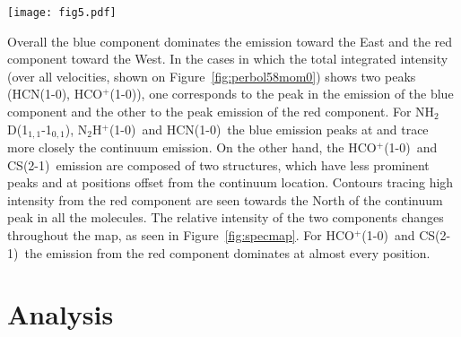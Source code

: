 \documentclass[iop]{emulateapj}
\newcommand{\nhtd}{\mbox{\rm NH$_2$D(1$_{1,1}$-1$_{0,1}$)}}
\newcommand{\nthp}{\mbox{\rm N$_2$H$^+$(1-0)}}
\newcommand{\hcn}{\mbox{\rm HCN(1-0)}}
\newcommand{\hcop}{\mbox{\rm  HCO$^+$(1-0)}}
\newcommand{\cs}{\mbox{\rm CS(2-1)}}
\begin{document}
\begin{figure*}[t]%

\texttt{[image: fig5.pdf]}
\caption{Integrated intensity maps for the red and blue peaks in Figure~\ref{fig:specmap}. The blue (red) contours correspond to the blue (red) component. The greyscale map shows the 3mm continuum emission. The integration velocity ranges are given in the text. For \nthp, the integration is shifted to be around the isolated hyperfine component. The contours correspond to emission starting at $3\sigma$ rms and increasing in steps of $7\sigma$ for  \nhtd, \hcn\ and \hcop\ and in steps of $3\sigma$ for \nthp\ and \cs. The blue and red arrows represent the outflow as in Figure~\ref{fig:perbol58mom0}.
\label{fig:mom0percomp} }
\end{figure*}


Overall the blue component dominates the emission toward the East and the red component toward the West. In the cases in which the total integrated intensity (over all velocities, shown on Figure~\ref{fig:perbol58mom0}) shows two peaks (\hcn, \hcop), one corresponds to the peak in the emission of the blue component and the other to the peak emission of the red component. For \nhtd, \nthp\ and \hcn\ the blue emission peaks at and trace more closely the continuum emission. On the other hand, the \hcop\ and \cs\ emission are composed of two structures, which have less prominent peaks and at positions offset from the continuum location. Contours tracing high intensity from the red component are seen towards the North of the continuum peak in all the molecules. The relative intensity of the two components changes throughout the map, as seen in Figure~\ref{fig:specmap}. For \hcop\ and \cs\ the emission from the red component dominates at almost every position.







\section{Analysis}
\end{document}
